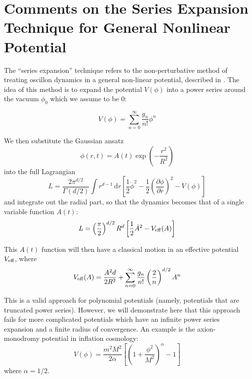\documentclass{report}
\begin{document}
\chapter{Comments on the Series Expansion Technique for General Nonlinear Potential}\label{nonpertprob}
The ``series expansion'' technique refers to the non-perturbative method of treating oscillon dynamics in a general non-linear potential, described in \cite{PhysRevD.80.125037, Gleiser:2008ty}. The idea of this method is to expand the potential $V(\phi)$ into a power series around the vacuum $\phi_0$ which we assume to be $0$:

\begin{equation}
  V(\phi)=\sum_{n=0}^\infty \frac{g_n}{n!}\phi^n
\end{equation}

We then substitute the Gaussian ansatz
\begin{equation}
  \phi(r,t) = A(t) \exp\left(-\frac{r^2}{R^2}\right)
\end{equation}
into the full Lagrangian
\begin{equation}\label{lagfull}
    L = \frac{2\pi^{d/2}}{\Gamma(d/2)}\int r^{d-1}\,\mathrm{d}r\left[\frac{1}{2}\dot{\phi}^2 -
      \frac{1}{2}\left(\frac{\partial\phi}{\partial r}\right)^2-V(\phi)\right]
\end{equation}
and integrate out the radial part, so that the dynamics becomes that of a single variable function $A(t)$:
\begin{equation}
  L= \left(\frac{\pi}{2}\right)^{d/2}R^d\left[\frac{1}{2}\dot{A}^2 - V_{\rm eff}(A)\right]
\end{equation}

This $A(t)$ function will then have a classical motion in an effective potential $V_{\rm eff}$, where
\begin{equation}\label{effpot}
  V_{\rm eff}(A) = \frac{A^2d}{2R^2} +
  \sum_{n=0}^\infty \frac{g_n}{n!}\left(\frac{2}{n}\right)^{d/2} A^n
\end{equation}

This is a valid approach for polynomial potentials (namely, potentials that are truncated power series). However, we will demonstrate here that this approach fails for more complicated potentials which have an infinite power series expansion and a finite radius of convergence. An example is the axion-monodromy potential in inflation cosmology:
\begin{equation}
  V(\phi) = \frac{m^2M^2}{2\alpha}\left[\left(1+\frac{\phi^2}{M^2}\right)^\alpha-1\right]
\end{equation}
where $\alpha=1/2$.
\end{document}
